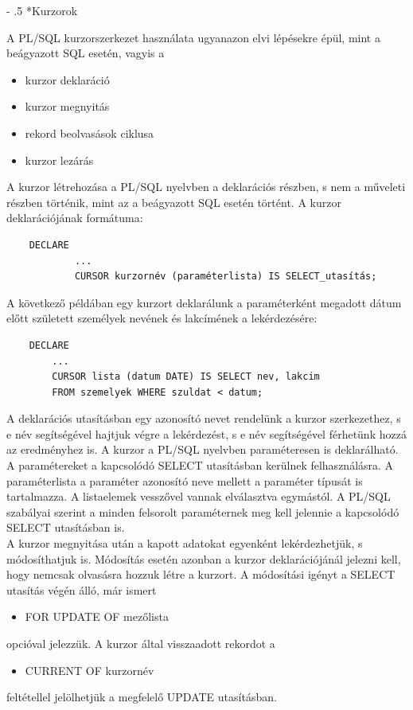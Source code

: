 \documentclass[tikz,12pt,margin=0px]{article}
\makeatletter
\renewcommand\paragraph{%
	\@startsection{paragraph}{4}{0mm}%
	{-\baselineskip}%
	{.5\baselineskip}%
	{\normalfont\normalsize\bfseries}}
\makeatother
\begin{document}
    \paragraph*{Kurzorok}

    \noindent A PL/SQL kurzorszerkezet használata ugyanazon elvi lépésekre épül, mint a beágyazott SQL esetén, vagyis a
    \begin{itemize}
    	\item kurzor deklaráció
    	\item kurzor megnyitás
    	\item rekord beolvasások ciklusa
    	\item kurzor lezárás
    \end{itemize}

    \noindent A kurzor létrehozása a PL/SQL nyelvben a deklarációs részben, s nem a műveleti részben történik, mint az a beágyazott SQL esetén történt. A kurzor deklarációjának formátuma:
    \begin{verbatim}
    DECLARE
    		...
    		CURSOR kurzornév (paraméterlista) IS SELECT_utasítás;
    \end{verbatim}

    \noindent A következő példában egy kurzort deklarálunk a paraméterként megadott dátum előtt született személyek nevének és lakcímének a lekérdezésére:
    \begin{verbatim}
    DECLARE
        ...
        CURSOR lista (datum DATE) IS SELECT nev, lakcim
        FROM szemelyek WHERE szuldat < datum;
    \end{verbatim}

    \noindent A deklarációs utasításban egy azonosító nevet rendelünk a kurzor szerkezethez, s e név segítségével hajtjuk végre a lekérdezést, s e név segítségével férhetünk hozzá az eredményhez is. A kurzor a PL/SQL nyelvben paraméteresen is deklarálható. A paramétereket a kapcsolódó SELECT utasításban kerülnek felhasználásra. A paraméterlista a paraméter azonosító neve mellett a paraméter típusát is tartalmazza. A listaelemek vesszővel vannak elválasztva egymástól.  A PL/SQL szabályai szerint a minden felsorolt paraméternek meg kell jelennie a kapcsolódó SELECT utasításban is.\\

    \noindent A kurzor megnyitása után a kapott adatokat egyenként lekérdezhetjük, s módosíthatjuk is. Módosítás esetén azonban a kurzor deklarációjánál jelezni kell, hogy nemcsak olvasásra hozzuk létre a kurzort. A módosítási igényt a SELECT utasítás végén álló, már ismert
    \begin{itemize}
        \item FOR UPDATE OF mezőlista
    \end{itemize}
    opcióval jelezzük. A kurzor által visszaadott rekordot a
    \begin{itemize}
        \item CURRENT OF kurzornév
    \end{itemize}
    feltétellel jelölhetjük a megfelelő UPDATE utasításban.
\end{document}
